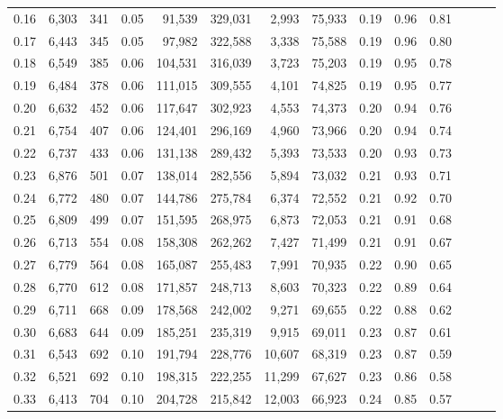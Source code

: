 \begin{tabular}{rrrrrrrrrrrrrr}
0.16 &   6,303 &    341 &  0.05 &   91,539 &  329,031 &   2,993 &  75,933 &  0.19 &  0.96 &      0.81 \\
0.17 &   6,443 &    345 &  0.05 &   97,982 &  322,588 &   3,338 &  75,588 &  0.19 &  0.96 &      0.80 \\
0.18 &   6,549 &    385 &  0.06 &  104,531 &  316,039 &   3,723 &  75,203 &  0.19 &  0.95 &      0.78 \\
0.19 &   6,484 &    378 &  0.06 &  111,015 &  309,555 &   4,101 &  74,825 &  0.19 &  0.95 &      0.77 \\
0.20 &   6,632 &    452 &  0.06 &  117,647 &  302,923 &   4,553 &  74,373 &  0.20 &  0.94 &      0.76 \\
0.21 &   6,754 &    407 &  0.06 &  124,401 &  296,169 &   4,960 &  73,966 &  0.20 &  0.94 &      0.74 \\
0.22 &   6,737 &    433 &  0.06 &  131,138 &  289,432 &   5,393 &  73,533 &  0.20 &  0.93 &      0.73 \\
0.23 &   6,876 &    501 &  0.07 &  138,014 &  282,556 &   5,894 &  73,032 &  0.21 &  0.93 &      0.71 \\
0.24 &   6,772 &    480 &  0.07 &  144,786 &  275,784 &   6,374 &  72,552 &  0.21 &  0.92 &      0.70 \\
0.25 &   6,809 &    499 &  0.07 &  151,595 &  268,975 &   6,873 &  72,053 &  0.21 &  0.91 &      0.68 \\
0.26 &   6,713 &    554 &  0.08 &  158,308 &  262,262 &   7,427 &  71,499 &  0.21 &  0.91 &      0.67 \\
0.27 &   6,779 &    564 &  0.08 &  165,087 &  255,483 &   7,991 &  70,935 &  0.22 &  0.90 &      0.65 \\
0.28 &   6,770 &    612 &  0.08 &  171,857 &  248,713 &   8,603 &  70,323 &  0.22 &  0.89 &      0.64 \\
0.29 &   6,711 &    668 &  0.09 &  178,568 &  242,002 &   9,271 &  69,655 &  0.22 &  0.88 &      0.62 \\
0.30 &   6,683 &    644 &  0.09 &  185,251 &  235,319 &   9,915 &  69,011 &  0.23 &  0.87 &      0.61 \\
0.31 &   6,543 &    692 &  0.10 &  191,794 &  228,776 &  10,607 &  68,319 &  0.23 &  0.87 &      0.59 \\
0.32 &   6,521 &    692 &  0.10 &  198,315 &  222,255 &  11,299 &  67,627 &  0.23 &  0.86 &      0.58 \\
0.33 &   6,413 &    704 &  0.10 &  204,728 &  215,842 &  12,003 &  66,923 &  0.24 &  0.85 &      0.57 \\

\end{tabular}
